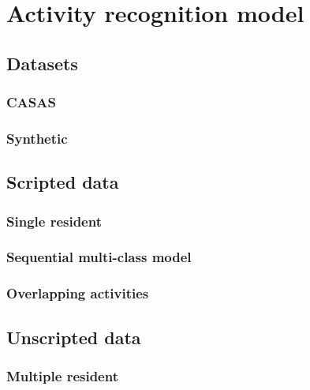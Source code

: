 \documentclass[11pt, a4paper, pdflatex, leqno, twoside, openright]{report}
\begin{document}
\chapter{Activity recognition model}
  \section{Datasets}
    \subsection{CASAS}
    \subsection{Synthetic}

  \section{Scripted data}
    \subsection{Single resident}
    \subsection{Sequential multi-class model\label{ch:smcm}}
    \subsection{Overlapping activities}


  \section{Unscripted data}
    \subsection{Multiple resident}
\end{document}
